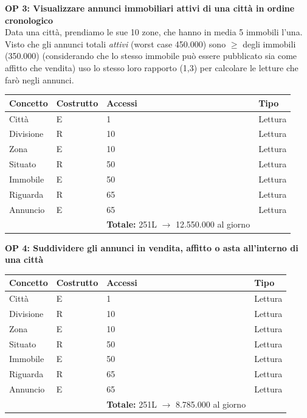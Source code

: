 \documentclass[a4paper,12pt]{report}
\begin{document}
            \textbf{OP 3: Visualizzare annunci immobiliari attivi di una città in ordine cronologico} \\
            Data una città, prendiamo le sue 10 zone, che hanno in media 5 immobili l'una. Visto che gli annunci totali \textit{attivi} (worst case 450.000) 
            sono $\ge$ degli immobili (350.000) (considerando che lo stesso immobile può essere pubblicato sia come affitto che vendita)
            uso lo stesso loro rapporto (1,3) per calcolare le letture che farò negli annunci.
        	\begin{table}[H]
            \centering
             \begin{tabular}{llll}
             \rowcolor{yellow!20} \textbf{Concetto} & \textbf{Costrutto} & \textbf{Accessi} & \textbf{Tipo}\\ [0.5ex] 
             \hline
             Città & E & 1 & Lettura \\ 
             Divisione & R & 10 & Lettura \\ 
             Zona & E & 10 & Lettura \\ 
             Situato & R & 50 & Lettura \\ 
             Immobile & E & 50 & Lettura \\ 
             Riguarda & R & 65 & Lettura \\ 
             Annuncio & E & 65 & Lettura \\ 
             \hline
                \rowcolor{yellow!20} &   & \textbf{Totale:} 251L $\rightarrow$ 12.550.000 al giorno &  \\ [1ex] 
             
             \end{tabular}
            \end{table}

            \textbf{OP 4: Suddividere gli annunci in vendita, affitto o asta all’interno di una città}
        	\begin{table}[H]
            \centering
             \begin{tabular}{llll}
             \rowcolor{yellow!20} \textbf{Concetto} & \textbf{Costrutto} & \textbf{Accessi} & \textbf{Tipo}\\ [0.5ex] 
             \hline
             Città & E & 1 & Lettura \\ 
             Divisione & R & 10 & Lettura \\ 
             Zona & E & 10 & Lettura \\ 
             Situato & R & 50 & Lettura \\ 
             Immobile & E & 50 & Lettura \\ 
             Riguarda & R & 65 & Lettura \\ 
             Annuncio & E & 65 & Lettura \\ 
             \hline
                \rowcolor{yellow!20} &   & \textbf{Totale:} 251L $\rightarrow$ 8.785.000 al giorno &  \\ [1ex] 
             
             \end{tabular}
            \end{table}
\end{document}
